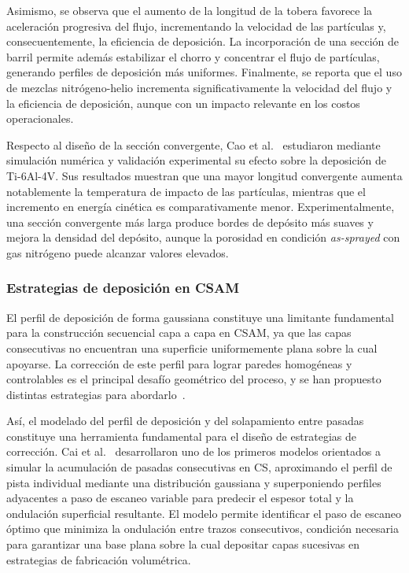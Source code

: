 Asimismo, se observa que el
aumento de la longitud de la tobera favorece la aceleración progresiva del flujo,
incrementando la velocidad de las partículas y, consecuentemente, la eficiencia
de deposición. La incorporación de una sección de barril permite además
estabilizar el chorro y concentrar el flujo de partículas, generando perfiles de
deposición más uniformes. Finalmente, se reporta que el uso de mezclas
nitrógeno-helio incrementa significativamente la velocidad del flujo y la
eficiencia de deposición, aunque con un impacto relevante en los costos
operacionales.

Respecto al diseño de la sección convergente, Cao et al.~\cite{Cao2022nozzle}
estudiaron mediante simulación numérica y validación experimental su efecto sobre
la deposición de Ti-6Al-4V. Sus resultados muestran que una mayor longitud
convergente aumenta notablemente la temperatura de impacto de las partículas,
mientras que el incremento en energía cinética es comparativamente menor.
Experimentalmente, una sección convergente más larga produce bordes de depósito
más suaves y mejora la densidad del depósito, aunque la porosidad en condición
\textit{as-sprayed} con gas nitrógeno puede alcanzar valores elevados. 

\subsubsection{Estrategias de deposición en CSAM}

El perfil de deposición de forma gaussiana constituye una limitante fundamental
para la construcción secuencial capa a capa en CSAM, ya que las capas
consecutivas no encuentran una superficie uniformemente plana sobre la cual
apoyarse. La corrección de este perfil para lograr paredes homogéneas y
controlables es el principal desafío geométrico del proceso, y se han propuesto
distintas estrategias para abordarlo~\cite{Moridi2014}.

Así, el modelado del perfil de deposición y del solapamiento entre pasadas 
constituye una herramienta fundamental para el diseño de estrategias 
de corrección. Cai et al.~\cite{Cai2014overlap} desarrollaron uno de los 
primeros modelos orientados a simular la acumulación de pasadas consecutivas 
en CS, aproximando el perfil de pista individual mediante una distribución 
gaussiana y superponiendo perfiles adyacentes a paso de escaneo variable 
para predecir el espesor total y la ondulación superficial resultante. 
El modelo permite identificar el paso de escaneo óptimo que minimiza la 
ondulación entre trazos consecutivos, condición necesaria para garantizar 
una base plana sobre la cual depositar capas sucesivas en estrategias de 
fabricación volumétrica.

